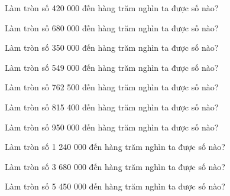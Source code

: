 \begin{ex}
Làm tròn số 420 000 đến hàng trăm nghìn ta được số nào?
\end{ex}

\begin{ex}
Làm tròn số 680 000 đến hàng trăm nghìn ta được số nào?
\end{ex}

\begin{ex}
Làm tròn số 350 000 đến hàng trăm nghìn ta được số nào?
\end{ex}

\begin{ex}
Làm tròn số 549 000 đến hàng trăm nghìn ta được số nào?
\end{ex}

\begin{ex}
Làm tròn số 762 500 đến hàng trăm nghìn ta được số nào?
\end{ex}

\begin{ex}
Làm tròn số 815 400 đến hàng trăm nghìn ta được số nào?
\end{ex}

\begin{ex}
Làm tròn số 950 000 đến hàng trăm nghìn ta được số nào?
\end{ex}

\begin{ex}
Làm tròn số 1 240 000 đến hàng trăm nghìn ta được số nào?
\end{ex}

\begin{ex}
Làm tròn số 3 680 000 đến hàng trăm nghìn ta được số nào?
\end{ex}

\begin{ex}
Làm tròn số 5 450 000 đến hàng trăm nghìn ta được số nào?
\end{ex}

